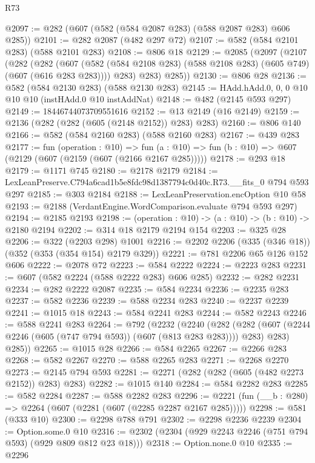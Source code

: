 \begin{lexlean}{R73}
\begin{coremodule}
@2097 := @282 (@607 (@582 (@584 @2087 @283) (@588 @2087 @283) @606 @285))
@2101 := @282 @2087 (@482 @297 @72)
@2107 := @582 (@584 @2101 @283) (@588 @2101 @283)
@2108 := @806 @18
@2129 := @2085
    (@2097
      (@2107
        (@282
          (@282
            (@607 (@582 (@584 @2108 @283) (@588 @2108 @283) (@605 @749) (@607 (@616 @283 @283))))
            @283)
          @283)
        @285))
@2130 := @806 @28
@2136 := @582 (@584 @2130 @283) (@588 @2130 @283)
@2145 := HAdd.hAdd.{0, 0, 0} @10 @10 @10 (instHAdd.{0} @10 instAddNat)
@2148 := @482 (@2145 @593 @297)
@2149 := 18446744073709551616
@2152 := @13 @2149 (@16 @2149)
@2159 := @2136 (@282 (@282 (@605 (@2148 @2152)) @283) @283)
@2160 := @806 @140
@2166 := @582 (@584 @2160 @283) (@588 @2160 @283)
@2167 := @439 @283
@2177 := fun (operation : @10) =>
  fun (a : @10) => fun (b : @10) => @607 (@2129 (@607 (@2159 (@607 (@2166 @2167 @285)))))
@2178 := @293 @18
@2179 := @1171 @745
@2180 := @2178 @2179
@2184 := LexLeanPreserve.C794a6cad1b5e8fdc98d1387794c0d40c.R73.__fits_0 @794 @593 @297
@2185 := @303 @2184
@2188 := LexLeanPreservation.encOption @10 @58
@2193 := @2188 (VerdantEngine.WordComparison.evaluate @794 @593 @297)
@2194 := @2185 @2193
@2198 := (operation : @10) -> (a : @10) -> (b : @10) -> @2180 @2194
@2202 := @314 @18 @2179 @2194 @154
@2203 := @325 @28
@2206 := @322 (@2203 @298) @1001
@2216 := @2202 @2206 (@335 (@346 @18)) (@352 (@353 (@354 @154) @2179 @329))
@2221 := @781 @2206 @65 @126 @152 @606
@2222 := @2078 @72
@2223 := @584 @2222
@2224 := @2223 @283
@2231 := @607 (@582 @2224 (@588 @2222 @283) @606 @285)
@2232 := @282 @2231
@2234 := @282 @2222 @2087
@2235 := @584 @2234
@2236 := @2235 @283
@2237 := @582 @2236
@2239 := @588 @2234 @283
@2240 := @2237 @2239
@2241 := @1015 @18
@2243 := @584 @2241 @283
@2244 := @582 @2243
@2246 := @588 @2241 @283
@2264 := @792
    (@2232
      (@2240
        (@282 (@282 (@607 (@2244 @2246 (@605 (@747 @794 @593)) (@607 (@813 @283 @283)))) @283) @283)
        @285))
@2265 := @1015 @28
@2266 := @584 @2265
@2267 := @2266 @283
@2268 := @582 @2267
@2270 := @588 @2265 @283
@2271 := @2268 @2270
@2273 := @2145 @794 @593
@2281 := @2271 (@282 (@282 (@605 (@482 @2273 @2152)) @283) @283)
@2282 := @1015 @140
@2284 := @584 @2282 @283
@2285 := @582 @2284
@2287 := @588 @2282 @283
@2296 := @2221 (fun (__b : @280) => @2264 (@607 (@2281 (@607 (@2285 @2287 @2167 @285)))))
@2298 := @581 (@333 @10)
@2300 := @2298 @788 @791
@2302 := @2298 @2236 @2239
@2304 := Option.some.{0} @10
@2316 := @2302 (@2304 (@929 @2243 @2246 (@751 @794 @593) (@929 @809 @812 @23 @18)))
@2318 := Option.none.{0} @10
@2335 := @2296

\end{coremodule}
\end{lexlean}

